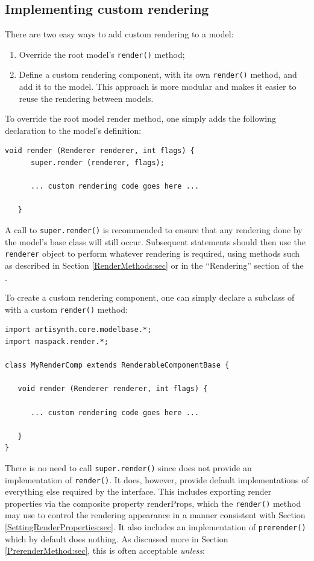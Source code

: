 \subsection{Implementing custom rendering}

There are two easy ways to add custom rendering to a model:

\begin{enumerate}

\item Override the root model's {\tt render()} method;

\item Define a custom rendering component, with its own {\tt render()} method, and add it to
the model. This approach is more modular and makes it easier to reuse
the rendering between models.

\end{enumerate}

To override the root model render method, one simply adds the
following declaration to the model's definition:
%
\begin{lstlisting}[]
   void render (Renderer renderer, int flags) {
      super.render (renderer, flags);
      
      ... custom rendering code goes here ...

   }
\end{lstlisting}
%
A call to {\tt super.render()} is recommended to ensure that any
rendering done by the model's base class will still occur. Subsequent
statements should then use the {\tt renderer} object to perform
whatever rendering is required, using methods such as described in
Section \ref{RenderMethods:sec} or in the ``Rendering'' section of the
.

To create a custom rendering component, one can simply declare a subclass
of 
with a custom {\tt render()} method:
%
\begin{lstlisting}[]
import artisynth.core.modelbase.*;
import maspack.render.*;

class MyRenderComp extends RenderableComponentBase {
  
   void render (Renderer renderer, int flags) {
      
      ... custom rendering code goes here ...

   }
}
\end{lstlisting}
%
There is no need to call {\tt super.render()} since 
does not provide an implementation of {\tt render()}.  It does,
however, provide default implementations of everything else required
by the  interface. This includes
exporting render properties via the composite property {\sf
renderProps}, which the {\tt render()} method may use to control the
rendering appearance in a manner consistent with
Section \ref{SettingRenderProperties:sec}. It also includes an
implementation of {\tt prerender()} which by default does nothing.  As
discussed more in Section \ref{PrerenderMethod:sec}, this is often
acceptable {\it unless}:

